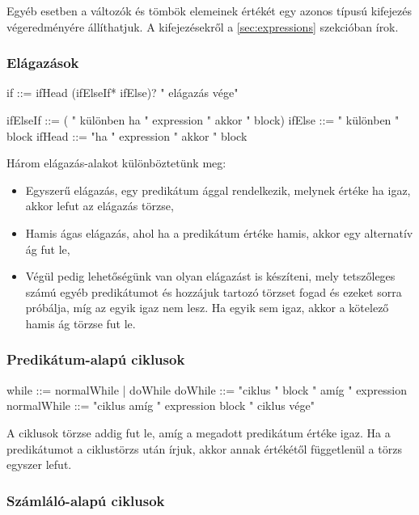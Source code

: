 Egyéb esetben a változók és tömbök elemeinek értékét egy azonos típusú kifejezés végeredményére állíthatjuk. A kifejezésekről a \ref{sec:expressions} szekcióban írok.

\subsubsection{Elágazások}

\begin{ebnf}
if ::= ifHead (ifElseIf* ifElse)? " elágazás vége"

ifElseIf ::= ( " különben ha " expression " akkor " block)
ifElse ::= " különben " block
ifHead ::= "ha " expression " akkor " block 
\end{ebnf}

Három elágazás-alakot különböztetünk meg:

\begin{itemize}
    \item Egyszerű elágazás, egy predikátum ággal rendelkezik, melynek értéke ha igaz, akkor lefut az elágazás törzse,
    \item Hamis ágas elágazás, ahol ha a predikátum értéke hamis, akkor egy alternatív ág fut le,
    \item Végül pedig lehetőségünk van olyan elágazást is készíteni, mely tetszőleges számú egyéb predikátumot és hozzájuk tartozó törzset fogad és ezeket sorra próbálja, míg az egyik igaz nem lesz. Ha egyik sem igaz, akkor a kötelező hamis ág törzse fut le.
\end{itemize}

\subsubsection{Predikátum-alapú ciklusok}

\begin{ebnf}
while ::= normalWhile | doWhile
doWhile ::= "ciklus " block " amíg " expression
normalWhile ::= "ciklus amíg " expression block " ciklus vége"
\end{ebnf}

A ciklusok törzse addig fut le, amíg a megadott predikátum értéke igaz. Ha a predikátumot a ciklustörzs után írjuk, akkor annak értékétől függetlenül a törzs egyszer lefut.

\subsubsection{Számláló-alapú ciklusok}

